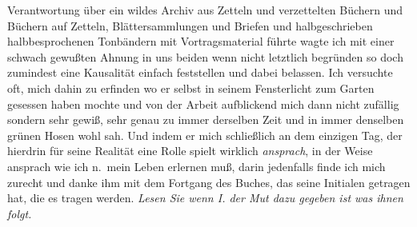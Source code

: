 \documentclass[
]{article}
\begin{document}
Verantwortung über ein wildes Archiv aus Zetteln und verzettelten
Büchern und Büchern auf Zetteln, Blättersammlungen und Briefen und
halbgeschrieben halbbesprochenen Tonbändern mit Vortragsmaterial führte
wagte ich mit einer schwach gewußten Ahnung in uns beiden wenn nicht
letztlich begründen so doch zumindest eine Kausalität einfach
feststellen und dabei belassen. Ich versuchte oft, mich dahin zu
erfinden wo er selbst in seinem Fensterlicht zum Garten gesessen haben
mochte und von der Arbeit aufblickend mich dann nicht zufällig sondern
sehr gewiß, sehr genau zu immer derselben Zeit und in immer denselben
grünen Hosen wohl sah. Und indem er mich schließlich an dem einzigen
Tag, der hierdrin für seine Realität eine Rolle spielt wirklich
\emph{ansprach}, in der Weise ansprach wie ich n.~mein Leben erlernen
muß, darin jedenfalls finde ich mich zurecht und danke ihm mit dem
Fortgang des Buches, das seine Initialen getragen hat, die es tragen
werden. \emph{Lesen Sie wenn I. der Mut dazu gegeben ist was ihnen
folgt.}
\end{document}
